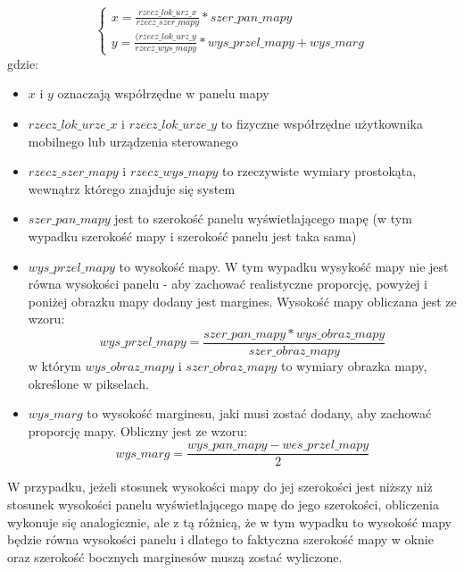 \documentclass{article}
\begin{document}
		\begin{equation}
			\left\{
				\begin{array}{l}
					x = \frac{rzecz\_lok\_urz\_x}{rzecz\_szer\_mapy} * szer\_pan\_mapy \\
					y = \frac{(rzecz\_lok\_urz\_y}{rzecz\_wys\_mapy} * wys\_przel\_mapy + wys\_marg 
				\end{array}
			\right.
		\end{equation}
		gdzie:
		\begin{itemize}
			\item $x$ i $y$ oznaczają współrzędne w panelu mapy
			\item $rzecz\_lok\_urze\_x$ i $rzecz\_lok\_urze\_y$ to fizyczne współrzędne użytkownika mobilnego lub urządzenia sterowanego
			\item $rzecz\_szer\_mapy$ i $rzecz\_wys\_mapy$ to rzeczywiste wymiary prostokąta, wewnątrz którego znajduje się system
			\item $szer\_pan\_mapy$ jest to szerokość panelu wyświetlającego mapę (w tym wypadku szerokość mapy i szerokość panelu jest taka sama)
			\item $wys\_przel\_mapy$ to wysokość mapy. W tym wypadku wysykość mapy nie jest równa wysokości panelu - aby zachować realistyczne proporcję, powyżej i poniżej obrazku mapy dodany jest margines. Wysokość mapy obliczana jest ze wzoru:
			\begin{equation}
				wys\_przel\_mapy = \frac{szer\_pan\_mapy * wys\_obraz\_mapy}{szer\_obraz\_mapy}
			\end{equation}
			w którym $wys\_obraz\_mapy$ i $szer\_obraz\_mapy$ to wymiary obrazka mapy, określone w pikselach.
			\item $wys\_marg$ to wysokość marginesu, jaki musi zostać dodany, aby zachować proporcję mapy. Obliczny jest ze wzoru:
			\begin{equation}
				wys\_marg = \frac{wys\_pan\_mapy - wes\_przel\_mapy}{2}
			\end{equation}
		\end{itemize}
		W przypadku, jeżeli stosunek wysokości mapy do jej szerokości jest niższy niż stosunek wysokości panelu wyświetlającego mapę do jego szerokości, obliczenia wykonuje się analogicznie, ale z tą różnicą, że w tym wypadku to wysokość mapy będzie równa wysokości panelu i dlatego to faktyczna szerokość mapy w oknie oraz szerokość bocznych marginesów muszą zostać wyliczone.
\end{document}
